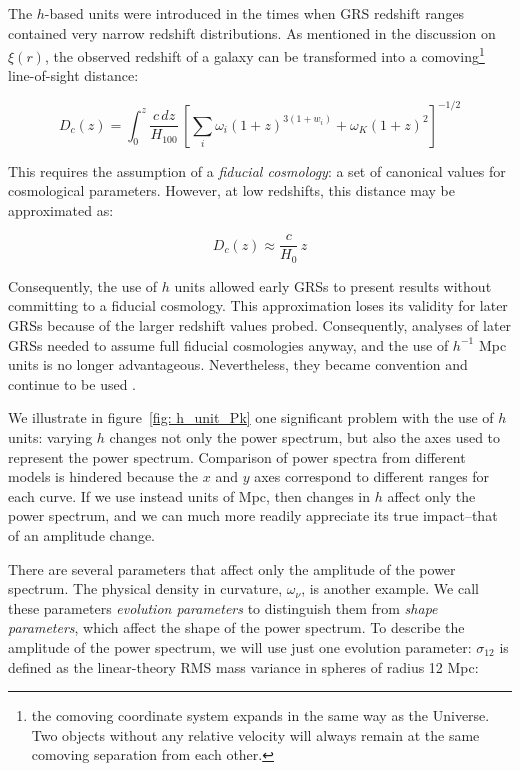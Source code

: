 The $h$-based units were introduced in the times when GRS redshift 
ranges contained very narrow redshift distributions. As mentioned in the
discussion on $\xi(r)$, the observed redshift of a galaxy can be transformed
into a comoving\footnote{the comoving coordinate system expands in the same
way as the Universe. Two objects without any relative velocity will always
remain at the same comoving separation from each other.} line-of-sight 
distance:

\begin{equation}
D_c (z)
=
\int_0^z \frac{c \, dz}{H_{100}}
\,
\left[
	\sum_i \omega_i (1 + z)^{3(1 + w_i)}
	+
	\omega_K (1 + z)^2
\right]^{-1/2}
\end{equation}

This requires the assumption of a \textit{fiducial cosmology}: a set of 
canonical values for cosmological parameters. However, at low
redshifts, this distance may be approximated as:

\begin{equation}
\label{eq: comov_dist_approx}
D_c(z) \approx \frac{c}{H_0} \, z
\end{equation}

Consequently, the use of $h$ units allowed early GRSs to present results
without committing to a fiducial cosmology. This
approximation loses its validity for later GRSs because of the larger redshift
values probed. Consequently, analyses of later GRSs needed to assume full 
fiducial cosmologies anyway, and the use of $h^{-1}$ Mpc units is no longer
advantageous. Nevertheless, they became convention and continue to be used 
.

We illustrate in figure~\ref{fig: h_unit_Pk} one significant problem with the
use of $h$ units: varying $h$ changes not only the power 
spectrum, but also the axes used to represent the power spectrum. Comparison 
of power spectra from different 
models is hindered because the $x$ and $y$ axes correspond to different ranges
for each curve. If we use instead units of Mpc, then changes in $h$ affect
only the power spectrum, and we can much more readily appreciate its true
impact--that of an amplitude change.


There are several parameters that affect only the amplitude of the power 
spectrum. The physical density in curvature, $\omega_\nu$, is another example.
We call these parameters \textit{evolution parameters} to distinguish them
from \textit{shape parameters}, which affect the shape of the power
spectrum. To describe the amplitude of the power spectrum, we will use just 
one evolution parameter: $\sigma_{12}$ is defined as the linear-theory RMS 
mass variance in spheres of radius 12 Mpc:

